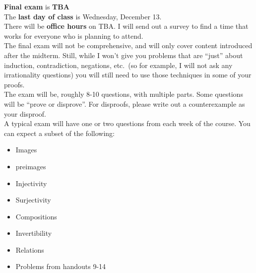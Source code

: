 \documentclass[12pt]{article}
\begin{document}
\textbf{Final exam} is \textbf{TBA}
\\

\noindent The \textbf{last day of class} is Wednesday, December 13. 
\\

\noindent There will be \textbf{office hours} on TBA. I will send out a survey to find a time that works for everyone who is planning to attend.%
\\

The final exam will not be comprehensive, and will only cover content introduced after the midterm. Still, while I won't give you problems that are ``just'' about induction, contradiction, negations, etc.~(so for example, I will not ask any irrationality questions) you will still need to use those techniques in some of your proofs.
\\

The exam will be, roughly 8-10 questions, with multiple parts. Some questions will be ``prove or disprove''. For disproofs, please write out a counterexample as your disproof.
\\

A typical exam will have one or two questions from each week of the course. You can expect a subset of the following:
\begin{itemize}
\item Images
\item preimages
\item Injectivity 
\item Surjectivity
\item Compositions
\item Invertibility
\item Relations
\item Problems from handouts 9-14
\end{itemize}




 
\end{document}
